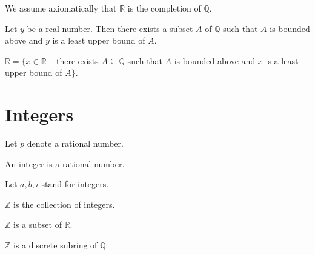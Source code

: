 \documentclass{article}
\begin{document}
We assume axiomatically that $\mathbb{R}$ is the completion of $\mathbb{Q}$.

\begin{forthel}
\begin{axiom} Let $y$ be a real number.
Then there exists a subset $A$ of $\mathbb{Q}$
such that $A$ is bounded above and
$y$ is a least upper bound of $A$.
\end{axiom}

\begin{theorem}
$\mathbb{R} = \{x \in \mathbb{R} \mid$ there exists $
A \subseteq \mathbb{Q}$ such that $
A$ is bounded above and $x$ is a least upper
bound of $A\}$.
\end{theorem}

\end{forthel}


\section{Integers}

\begin{forthel}
Let $p$ denote a rational number.

\begin{signature}
An integer is a rational number.
\end{signature}
Let $a,b,i$ stand for integers.

\begin{definition}
$\mathbb{Z}$ is the collection of integers.
\end{definition}


\begin{theorem}
$\mathbb{Z}$ is a subset of $\mathbb{R}$.
\end{theorem}

\end{forthel}


$\mathbb{Z}$ is a discrete subring of $\mathbb{Q}$:
\end{document}
